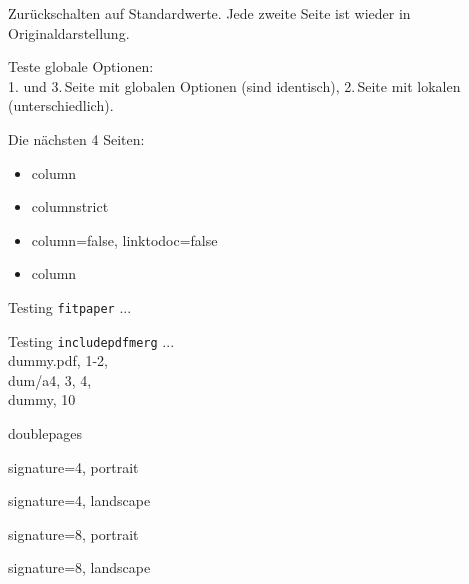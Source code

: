 \documentclass[a4paper]{article}
\begin{document}
\Huge



\begingroup
Zur\"uckschalten auf Standardwerte.
Jede zweite Seite ist wieder in Originaldarstellung.











\endgroup


\begingroup
Teste globale Optionen:\\
1. und 3.\,Seite mit globalen Optionen (sind identisch),
2.\,Seite mit lokalen (unterschiedlich).




\endgroup


\begingroup
Die n\"achsten 4 Seiten:
\begin{itemize}
  \item column
  \item columnstrict
  \item column=false, linktodoc=false
  \item column
\end{itemize}




\endgroup


\begingroup
Testing \texttt{fitpaper} ...

Testing \texttt{includepdfmerg} ...
\\dummy.pdf, 1-2, \\dum/a4, 3, 4, \\dummy, 10
\endgroup

\begingroup
doublepages

signature=4, portrait

signature=4, landscape

signature=8, portrait

signature=8, landscape

\endgroup
\end{document}
